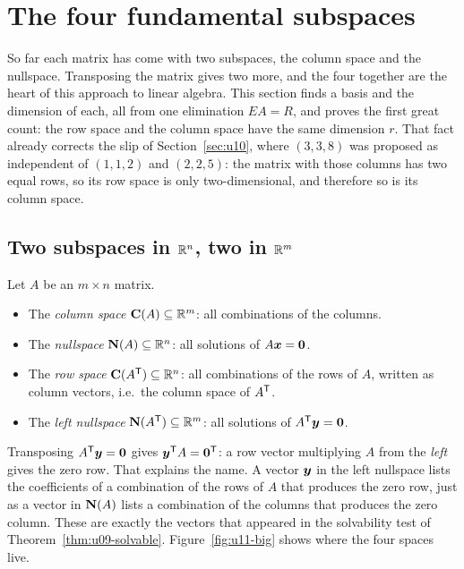 \section{The four fundamental subspaces}\label{sec:u11}

So far each matrix has come with two subspaces, the column space and the nullspace. Transposing
the matrix gives two more, and the four together are the heart of this approach to linear algebra.
This section finds a basis and the dimension of each, all from one elimination $EA=R$, and proves the
first great count: the row space and the column space have the same dimension $r$. That fact
already corrects the slip of Section~\ref{sec:u10}, where $(3,3,8)$ was proposed as independent of
$(1,1,2)$ and $(2,2,5)$: the matrix with those columns has two equal rows, so its row space is only
two-dimensional, and therefore so is its column space.

\subsection{Two subspaces in \texorpdfstring{\(\mathbb{R}^n\)}{Rn}, two in \texorpdfstring{\(\mathbb{R}^m\)}{Rm}}

\begin{definition}\label{def:u11-four}
Let $A$ be an $m\times n$ matrix.
\begin{itemize}
\item The \emph{column space} $\mathbf{C}(A)\subseteq\mathbb{R}^m$: all combinations of the columns.
\item The \emph{nullspace} $\mathbf{N}(A)\subseteq\mathbb{R}^n$: all solutions of $A\boldsymbol{x}=\boldsymbol{0}$.
\item The \emph{row space} $\mathbf{C}(A^{\mathsf{T}})\subseteq\mathbb{R}^n$: all combinations of the rows of $A$, written as
column vectors, i.e.\ the column space of $A^{\mathsf{T}}$.
\item The \emph{left nullspace} $\mathbf{N}(A^{\mathsf{T}})\subseteq\mathbb{R}^m$: all solutions of $A^{\mathsf{T}}\boldsymbol{y}=\boldsymbol{0}$.
\end{itemize}
\end{definition}

Transposing $A^{\mathsf{T}}\boldsymbol{y}=\boldsymbol{0}$ gives $\boldsymbol{y}^{\mathsf{T}} A=\boldsymbol{0}^{\mathsf{T}}$: a row vector multiplying $A$ from the
\emph{left} gives the zero row. That explains the name. A vector $\boldsymbol{y}$ in the left nullspace lists
the coefficients of a combination of the rows of $A$ that produces the zero row, just as a vector in
$\mathbf{N}(A)$ lists a combination of the columns that produces the zero column. These are exactly the
vectors that appeared in the solvability test of Theorem~\ref{thm:u09-solvable}.
Figure~\ref{fig:u11-big} shows where the four spaces live.

